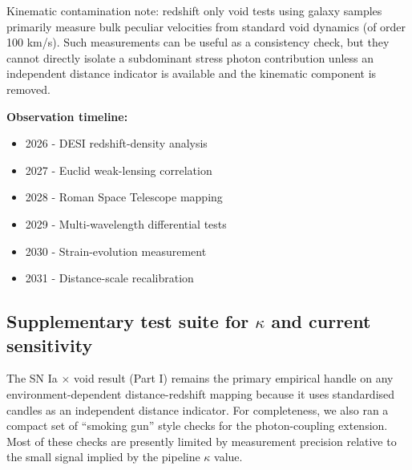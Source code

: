 \documentclass[11pt,a4paper]{article}
\begin{document}
Kinematic contamination note: redshift only void tests using galaxy samples primarily measure bulk peculiar velocities from standard void dynamics (of order 100 km/\allowbreak{}s). Such measurements can be useful as a consistency check, but they cannot directly isolate a subdominant stress photon contribution unless an independent distance indicator is available and the kinematic component is removed.

\begin{mdframed}[linecolor=accent,linewidth=0.5pt,backgroundcolor=callout-bg,leftline=true,rightline=true,topline=true,bottomline=true,innerleftmargin=8pt,innerrightmargin=8pt,innertopmargin=6pt,innerbottommargin=6pt]
\textbf{Observation timeline:}\begin{itemize}
  \item 2026 - DESI redshift-density analysis
  \item 2027 - Euclid weak-lensing correlation
  \item 2028 - Roman Space Telescope mapping
  \item 2029 - Multi-wavelength differential tests
  \item 2030 - Strain-evolution measurement
  \item 2031 - Distance-scale recalibration
\end{itemize}
\end{mdframed}

\subsection{Supplementary test suite for $\kappa$ and current sensitivity}
The SN Ia $\times$ void result (Part I) remains the primary empirical handle on any environment-dependent distance-redshift mapping because it uses
standardised candles as an independent distance indicator. For completeness, we also ran a compact set of ``smoking gun'' style checks for the photon-coupling extension.
Most of these checks are presently limited by measurement precision relative to the small signal implied by the pipeline $\kappa$ value.
\end{document}
